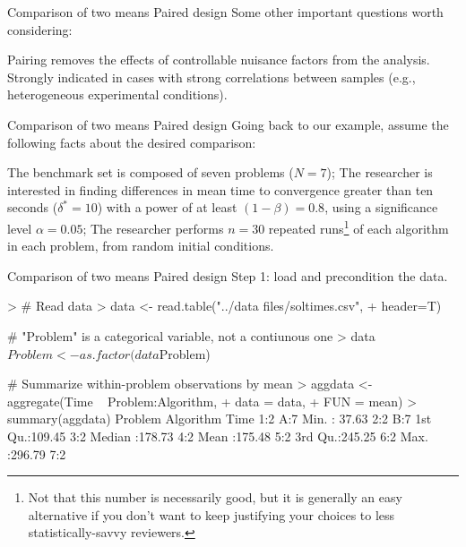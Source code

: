 \documentclass[t]{beamer}
\begin{document}

\begin{ftst}
{Comparison of two means}
{Paired design}
Some other important questions worth considering:

\bitems Pairing removes the effects of controllable nuisance factors from the analysis.
\spitem
Strongly indicated in cases with strong correlations between samples (e.g., heterogeneous experimental conditions).
\eitem
\end{ftst}


\begin{ftst}
{Comparison of two means}
{Paired design}
Going back to our example, assume the following facts about the desired comparison:

\bitems The benchmark set is composed of seven problems ($N=7$);
\spitem The researcher is interested in finding differences in mean time to convergence greater than ten seconds ($\delta^*=10$) with a power of at least $(1-\beta)=0.8$, using a significance level $\alpha=0.05$;
\spitem The researcher performs $n=30$ repeated runs\footnote[1]{\tiny Not that this number is necessarily good, but it is generally an easy alternative if you don't want to keep justifying your choices to less statistically-savvy reviewers.} of each algorithm in each problem, from random initial conditions.
\eitem

\end{ftst}

\begin{ftstf}
{Comparison of two means}
{Paired design}
Step 1: load and precondition the data.
\begin{rcode}
> # Read data
> data <- read.table("../data files/soltimes.csv",
+                    header=T)

# "Problem" is a categorical variable, not a contiunous one
> data$Problem <- as.factor(data$Problem)

# Summarize within-problem observations by mean
> aggdata <- aggregate(Time ~ Problem:Algorithm,
+                      data = data,
+                      FUN  = mean)
> summary(aggdata)
 Problem Algorithm      Time       
 1:2     A:7       Min.   : 37.63  
 2:2     B:7       1st Qu.:109.45  
 3:2               Median :178.73  
 4:2               Mean   :175.48  
 5:2               3rd Qu.:245.25  
 6:2               Max.   :296.79  
 7:2                               

\end{rcode}
\end{ftstf}
\end{document}
